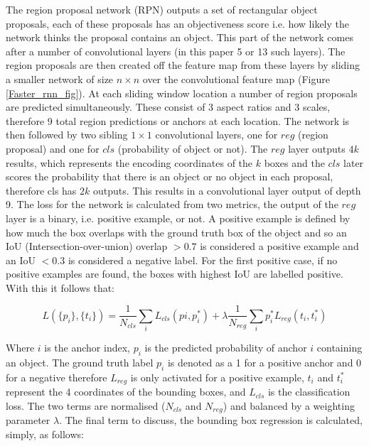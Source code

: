 \documentclass[a4paper,11pt,notitlepage]{article}
\begin{document}
The region proposal network (RPN) outputs a set of rectangular object proposals, each of these proposals has an objectiveness score i.e. how likely the network thinks the proposal contains an object. This part of the network comes after a number of convolutional layers (in this paper 5 or 13 such layers). The region proposals are then created off the feature map from these layers by sliding a smaller network of size $n \times n$ over the convolutional feature map (Figure \ref{Faster_rnn_fig}). At each sliding window location a number of region proposals are predicted simultaneously. These consist of 3 aspect ratios and 3 scales, therefore 9 total region predictions or anchors at each location. The network is then followed by two sibling $1 \times 1$ convolutional layers, one for $reg$ (region proposal) and one for $cls$ (probability of object or not). The $reg$ layer outputs 4$k$ results, which represents the encoding coordinates of the $k$ boxes and the $cls$ later scores the probability that there is an object or no object in each proposal, therefore cls has $2k$ outputs. This results in a convolutional layer output of depth 9.
\newline \newline
The loss for the network is calculated from two metrics, the output of the $reg$ layer is a binary, i.e. positive example, or not. A positive example is defined by how much the box overlaps with the ground truth box of the object and so an IoU (Intersection-over-union) overlap $> 0.7$ is considered a positive example and an IoU $< 0.3$ is considered a negative label. For the first positive case, if no positive examples are found, the boxes with highest IoU  are labelled positive. With this it follows that:

\begin{equation}
\label{multi-task_loss_fast_rcnn}
L(\{p_{i}\},\{t_{i}\}) = \frac{1}{N_{cls}} \sum_{i} L_{cls}(p{i},p_{i}^{*}) + \lambda \frac{1}{N_{reg}} \sum_{i}p_{i}^{*} L_{reg}(t_{i},t_{i}^{*})
\end{equation}

Where $i$ is the anchor index, $p_{i}$ is the predicted probability of anchor $i$ containing an object. The ground truth label $p_{i}$ is denoted as a 1 for a positive anchor and 0 for a negative therefore $L_{reg}$ is only activated for a positive example, $t_{i}$ and $t_{i}^{*}$ represent the 4 coordinates of the bounding boxes, and $L_{cls}$ is the classification loss. The two terms are normalised ($N_{cls}$ and $N_{reg}$) and balanced by a weighting parameter $\lambda$. The final term to discuss, the bounding box regression is calculated, simply, as follows:
\end{document}

